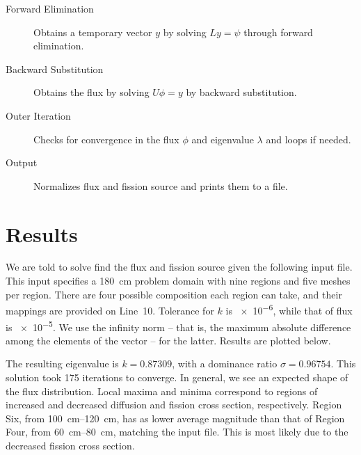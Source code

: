 \documentclass[fleqn,11pt]{article}
\begin{document}
\begin{description}
  \item [Forward Elimination] Obtains a temporary vector \(y\) by solving \(L y = \psi\) through forward elimination.
  
  \item [Backward Substitution] Obtains the flux by solving \(U \phi = y\) by backward substitution.
  
  \item [Outer Iteration] Checks for convergence in the flux \(\phi\) and eigenvalue \(\lambda\) and loops if needed.
  
  \item [Output] Normalizes flux and fission source and prints them to a file.
\end{description}

\section{Results}
We are told to solve find the flux and fission source given 
the following input file. This input specifies a \SI{180}{\centi\meter}
problem domain with nine regions and five meshes per region.
There are four possible composition each region can take,
and their mappings are provided on Line~10. Tolerance for 
\(k\) is \num{e-6}, while that of flux is \num{e-5}. We use 
the infinity norm -- that is, the maximum absolute difference 
among the elements of the vector -- for the latter. Results 
are plotted below.



The resulting eigenvalue is \(k = 0.87309\), with a dominance
ratio \(\sigma = 0.96754\). This solution took 175 iterations
to converge. In general, we see an expected shape of the 
flux distribution. Local maxima and minima correspond to 
regions of increased and decreased diffusion and fission 
cross section, respectively. Region Six, from 
\SIrange{100}{120}{\centi\meter}, has as lower average 
magnitude than that of Region Four, from 
\SIrange{60}{80}{\centi\meter}, matching the input file. 
This is most likely due to the decreased fission cross 
section.

\begin{center}
\end{center}
\end{document}
